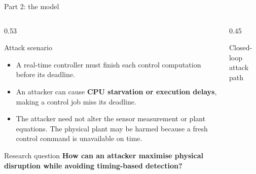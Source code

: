 \documentclass[8pt,aspectratio=169]{beamer}
\gdef\CPSOrigin{PAPER}%
\gdef\CPSSourceContext{}%
\begin{document}
\begin{frame}{Part 2: the model}
\gdef\CPSSourceContext{}
\gdef\CPSOrigin{PAPER}

\begin{columns}[T,onlytextwidth]

\begin{column}{0.53\textwidth}

\begin{block}{Attack scenario}
\begin{itemize}
\tightitemize
    \item A real-time controller must finish each control
    computation before its deadline.

    \item An attacker can cause \textbf{CPU starvation or
    execution delays}, making a control job miss its deadline.

    \item The attacker need not alter the sensor measurement
    or plant equations. The physical plant may be harmed
    because a fresh control command is unavailable on time.
\end{itemize}
\end{block}

\begin{alertblock}{Research question}
\centering
\textbf{How can an attacker maximise physical disruption
while avoiding timing-based detection?}
\end{alertblock}

\end{column}

\begin{column}{0.45\textwidth}

\begin{block}{Closed-loop attack path}
\centering

\end{block}
\end{column}
\end{columns}
\end{frame}
\end{document}
